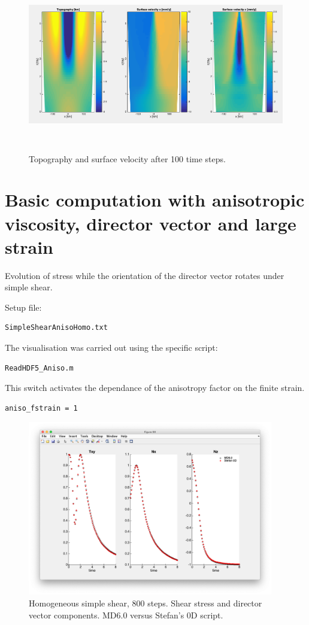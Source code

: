 \documentclass[12pt,english,openany]{scrbook}
\begin{document}
\begin{figure}[ht!]
\centerline{\includegraphics[height=3.0in]{./Figures/RiftingPauline_MDOODZ2.png}}
\caption{Topography and surface velocity after 100 time steps.}
\label{RiftingPauline_MDOODZ2}
\end{figure}

\section{Basic computation with anisotropic viscosity, director vector and large strain}

Evolution of stress while the orientation of the director vector rotates under simple shear.

Setup file:
\begin{verbatim} 
SimpleShearAnisoHomo.txt
\end{verbatim}

The visualisation was carried out using the specific script:
\begin{verbatim} 
ReadHDF5_Aniso.m
\end{verbatim}

This switch activates the dependance of the anisotropy factor on the finite strain.
\begin{verbatim} 
aniso_fstrain = 1
\end{verbatim}

\begin{figure}[ht!]
\centerline{\includegraphics[height=3.0in]{./Figures/FiniteStrainAnisotropy_MDOODZ.png}}
\caption{Homogeneous simple shear, 800 steps. Shear stress and director vector components. MD6.0 versus Stefan's 0D script.}
\label{FiniteStrainAnisotropy_MDOODZ}
\end{figure}
\end{document}
